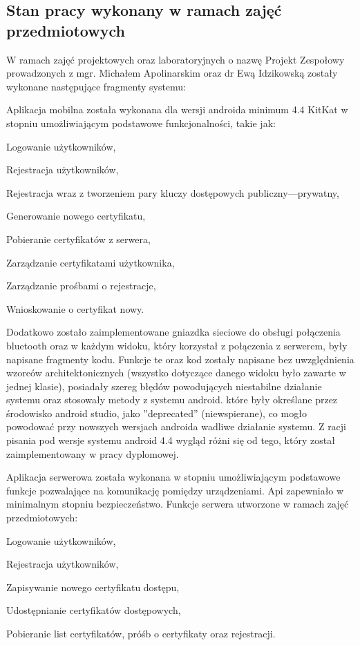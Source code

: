 \newpage
\subsection{Stan pracy wykonany w ramach zajęć \newline przedmiotowych} 
W ramach zajęć projektowych oraz laboratoryjnych o nazwę Projekt Zespołowy prowadzonych z mgr. Michałem Apolinarskim oraz dr Ewą Idzikowską zostały wykonane następujące fragmenty systemu:
	
	Aplikacja mobilna została wykonana dla wersji androida minimum 4.4 KitKat w stopniu umożliwiającym podstawowe funkcjonalności, takie jak:
	\begin{itemize*}
		\item Logowanie użytkowników,
		\item Rejestracja użytkowników,
		\item Rejestracja wraz z tworzeniem pary kluczy dostępowych publiczny---prywatny,
		\item Generowanie nowego certyfikatu,
		\item Pobieranie certyfikatów z serwera,
		\item Zarządzanie certyfikatami użytkownika,
		\item Zarządzanie prośbami o rejestracje,
		\item Wnioskowanie o certyfikat nowy.
	\end{itemize*}

		Dodatkowo zostało zaimplementowane gniazdka sieciowe do obsługi połączenia bluetooth oraz w każdym widoku, który korzystał z połączenia z serwerem, były napisane fragmenty kodu. Funkcje te oraz kod zostały napisane bez uwzględnienia wzorców architektonicznych (wszystko dotyczące danego widoku było zawarte w jednej klasie), posiadały szereg błędów powodujących niestabilne działanie systemu oraz stosowały metody z systemu android. które były określane przez środowisko android studio, jako ''deprecated'' (niewspierane), co mogło powodować przy nowszych wersjach androida wadliwe działanie systemu. Z racji pisania pod wersje systemu android 4.4 wygląd różni się od tego, który został zaimplementowany w pracy dyplomowej.

   Aplikacja serwerowa została wykonana w stopniu umożliwiającym podstawowe funkcje pozwalające na komunikację pomiędzy urządzeniami. Api zapewniało w minimalnym stopniu bezpieczeństwo. Funkcje serwera utworzone w ramach zajęć przedmiotowych:
   	\begin{itemize*}
   		\item Logowanie użytkowników,
   		\item Rejestracja użytkowników,
   		\item Zapisywanie nowego certyfikatu dostępu,
   		\item Udostępnianie certyfikatów dostępowych,
   		\item Pobieranie list certyfikatów, próśb o certyfikaty oraz rejestracji.
   	\end{itemize*}
   

